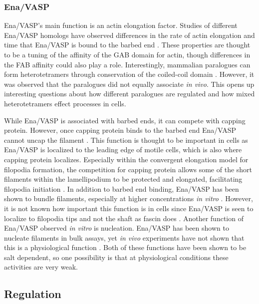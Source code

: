 \subsubsection{Ena/VASP}
Ena/VASP's main function is an actin elongation factor. Studies of different Ena/VASP homologs have observed differences in the rate of actin elongation and time that Ena/VASP is bound to the barbed end \citep{breitsprecher_clustering_2008,breitsprecher_molecular_2011,hansen_vasp_2010,winkelman_ena/vasp_2014}. These properties are thought to be a tuning of the affinity of the GAB domain for actin, though differences in the FAB affinity could also play a role. Interestingly, mammalian paralogues can form heterotetramers through conservation of the coiled-coil domain \citep{riquelme_selectivity_2015}. However, it was observed that the paralogues did not equally associate \textit{in vivo}. This opens up interesting questions about how different paralogues are regulated and how mixed heterotetramers effect processes in cells. 

While Ena/VASP is associated with barbed ends, it can compete with capping protein. However, once capping protein binds to the barbed end Ena/VASP cannot uncap the filament \citep{applewhite_ena/vasp_2007, bear_ena/vasp:_2009, winkelman_ena/vasp_2014,barzik_ena/vasp_2005}. This function is thought to be important in cells as Ena/VASP is localized to the leading edge of motile cells, which is also where capping protein localizes. Especially within the convergent elongation model for filopodia formation, the competition for capping protein allows some of the short filaments within the lamellipodium to be protected and elongated, facilitating filopodia initiation \citep{svitkina_mechanism_2003}. 
In addition to barbed end binding, Ena/VASP has been shown to bundle filaments, especially at higher concentrations \textit{in vitro} \citep{bachmann_evh2_1999,barzik_ena/vasp_2005}. However, it is not known how important this function is in cells since Ena/VASP is seen to localize to filopodia tips and not the shaft as fascin does \citep{svitkina_mechanism_2003,lanier_mena_1999}. Another function of Ena/VASP observed \textit{in vitro} is nucleation. Ena/VASP has been shown to nucleate filaments in bulk assays, yet \textit{in vivo} experiments have not shown that this is a physiological function \citep{bear_ena/vasp:_2009}. Both of these functions have been shown to be salt dependent, so one possibility is that at physiological conditions these activities are very weak. 

\subsection{Regulation}\label{ena-formin-regulation}

